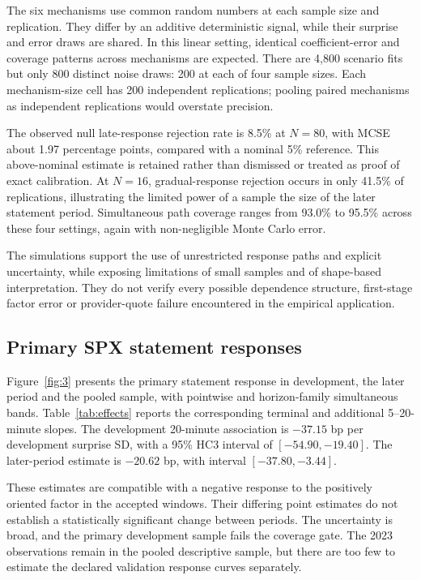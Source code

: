 
The six mechanisms use common random numbers at each sample size and replication. They differ by an additive deterministic signal, while their surprise and error draws are shared. In this linear setting, identical coefficient-error and coverage patterns across mechanisms are expected. There are 4,800 scenario fits but only 800 distinct noise draws: 200 at each of four sample sizes. Each mechanism-size cell has 200 independent replications; pooling paired mechanisms as independent replications would overstate precision.


The observed null late-response rejection rate is 8.5\% at $N=80$, with MCSE about 1.97 percentage points, compared with a nominal 5\% reference. This above-nominal estimate is retained rather than dismissed or treated as proof of exact calibration. At $N=16$, gradual-response rejection occurs in only 41.5\% of replications, illustrating the limited power of a sample the size of the later statement period. Simultaneous path coverage ranges from 93.0\% to 95.5\% across these four settings, again with non-negligible Monte Carlo error.

The simulations support the use of unrestricted response paths and explicit uncertainty, while exposing limitations of small samples and of shape-based interpretation. They do not verify every possible dependence structure, first-stage factor error or provider-quote failure encountered in the empirical application.

\label{sec:results}
\subsection{Primary SPX statement responses}
Figure~\ref{fig:3} presents the primary statement response in development, the later period and the pooled sample, with pointwise and horizon-family simultaneous bands. Table~\ref{tab:effects} reports the corresponding terminal and additional 5--20-minute slopes. The development 20-minute association is $-37.15$ bp per development surprise SD, with a 95\% HC3 interval of $[-54.90,-19.40]$. The later-period estimate is $-20.62$ bp, with interval $[-37.80,-3.44]$.


These estimates are compatible with a negative response to the positively oriented factor in the accepted windows. Their differing point estimates do not establish a statistically significant change between periods. The uncertainty is broad, and the primary development sample fails the coverage gate. The 2023 observations remain in the pooled descriptive sample, but there are too few to estimate the declared validation response curves separately.

